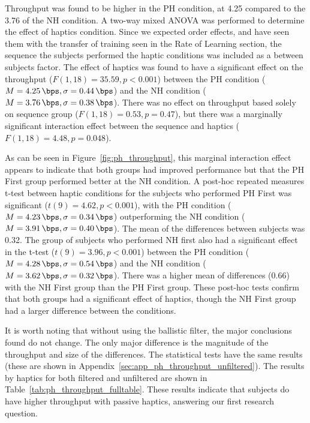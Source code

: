 Throughput was found to be higher in the PH condition, at \SI{4.25}{\bps} compared to the \SI{3.76}{\bps} of the NH condition.
A two-way mixed ANOVA was performed to determine the effect of haptics condition.
Since we expected order effects, and have seen them with the transfer of training seen in the Rate of Learning section, the sequence the subjects performed the haptic conditions was included as a between subjects factor.
The effect of haptics was found to have a significant effect on the throughput ($F(1,18)=35.59, p<0.001$) between the PH condition ($M=\SI{4.25}{\bps}, \sigma=\SI{0.44}{\bps}$) and the NH condition ($M=\SI{3.76}{\bps}, \sigma=\SI{0.38}{\bps}$).
There was no effect on throughput based solely on sequence group ($F(1,18)=0.53, p=0.47$), but there was a marginally significant interaction effect between the sequence and haptics ($F(1,18)=4.48, p=0.048$).

As can be seen in Figure~\ref{fig:ph_throughput}, this marginal interaction effect appears to indicate that both groups had improved performance but that the PH First group performed better at the NH condition.
A post-hoc repeated measures t-test between haptic conditions for the subjects who performed PH First was significant ($t(9)=4.62, p<0.001$), with the PH condition ($M=\SI{4.23}{\bps}, \sigma=\SI{0.34}{\bps}$) outperforming the NH condition ($M=\SI{3.91}{\bps}, \sigma=\SI{0.40}{\bps}$).
The mean of the differences between subjects was \SI{0.32}{\bps}.
The group of subjects who performed NH first also had a significant effect in the t-test ($t(9)=3.96, p<0.001$) between the PH condition ($M=\SI{4.28}{\bps}, \sigma=\SI{0.54}{\bps}$) and the NH condition ($M=\SI{3.62}{\bps}, \sigma=\SI{0.32}{\bps}$).
There was a higher mean of differences (\SI{0.66 }{\bps}) with the NH First group than the PH First group.
These post-hoc tests confirm that both groups had a significant effect of haptics, though the NH First group had a larger difference between the conditions.

It is worth noting that without using the ballistic filter, the major conclusions found do not change.
The only major difference is the magnitude of the throughput and size of the differences.
The statistical tests have the same results (these are shown in Appendix~\ref{sec:app_ph_throughput_unfiltered}).
The results by haptics for both filtered and unfiltered are shown in Table~\ref{tab:ph_throughput_fulltable}.
These results indicate that subjects do have higher throughput with passive haptics, answering our first research question.

